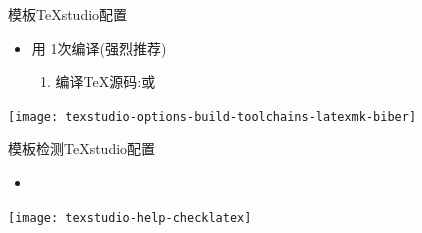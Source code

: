 \documentclass[fontset = adobe, xcolor=svgnames, t, aspectratio=169]{ctexbeamer}
\begin{document}
\begin{frame}{\nwafuthesis 模板}{TeXstudio配置}
  \stretchon
  \begin{itemize}
  \item 用 \alert{1次}编译(\alert{强烈推荐})
    \begin{enumerate}
    \item {} 编译\TeX 源码:或
    \end{enumerate}
  \end{itemize}
  \centering
  \begin{annotatedFigure}
    {\texttt{[image: texstudio-options-build-toolchains-latexmk-biber]}}
  \end{annotatedFigure}
  \stretchoff
\end{frame}

\begin{frame}{\nwafuthesis 模板}{检测TeXstudio配置}
  \stretchon
  \begin{itemize}
  \item {}
    
  \end{itemize}
  \centering
  \begin{annotatedFigure}
    {\texttt{[image: texstudio-help-checklatex]}}
  \end{annotatedFigure}
  \stretchoff
\end{frame}
\end{document}

